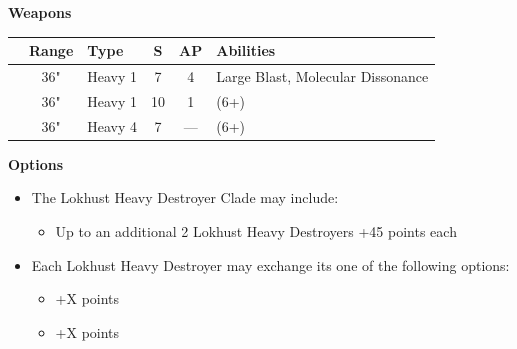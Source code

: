 \begin{minipage}[t]{0.72\textwidth}
	\vspace*{2em}
	\textbf{Weapons}
	
	\begin{tabular}{L{90 pt} c C{40pt} *{2}{c} >{\raggedright\arraybackslash}p{130pt}}
		& Range & Type & S & AP & Abilities \\
		\hline
		 & 36" & Heavy 1 & 7 & 4 & Large Blast, Molecular Dissonance \\
		 & 36" & Heavy 1 & 10 & 1 &   (6+) \\
		 & 36" & Heavy 4 & 7 & — &   (6+) \\
	\end{tabular}
	
	\vspace*{2em}
	\textbf{Options}
	\begin{itemize}
		\item The Lokhust Heavy Destroyer Clade may include:
		\begin{itemize}
			\item Up to an additional 2 Lokhust Heavy Destroyers \dotfill +45 points each
		\end{itemize}
		\item Each Lokhust Heavy Destroyer may exchange its  one of the following options:
		\begin{itemize}
			\item {} \dotfill +X points
			\item {} \dotfill +X points
		\end{itemize}
	\end{itemize}
\end{minipage}
\hspace{0.5em}



\newpage
\subsubsection[Triarch Stalker]{}

